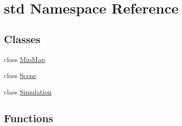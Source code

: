 \hypertarget{namespacestd}{}\section{std Namespace Reference}
\label{namespacestd}
\subsection*{Classes}
\begin{DoxyCompactItemize}
\item 
class \hyperlink{classstd_1_1MipMap}{Mip\+Map}
\item 
class \hyperlink{classstd_1_1Scene}{Scene}
\item 
class \hyperlink{classstd_1_1Simulation}{Simulation}
\end{DoxyCompactItemize}
\subsection*{Functions}
